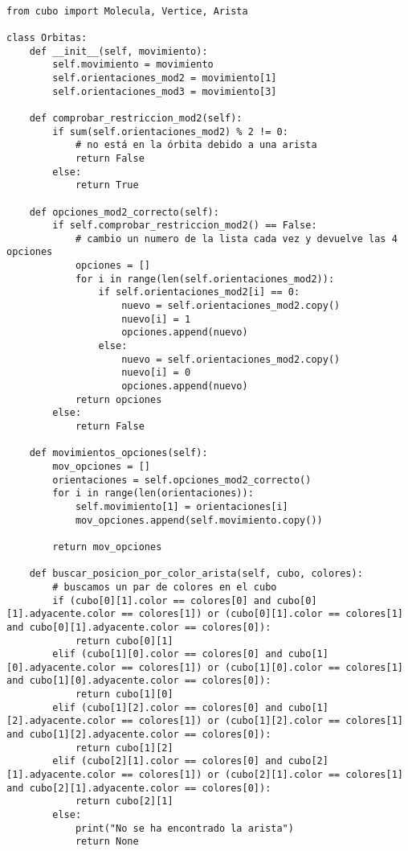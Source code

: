 \begin{lstlisting}

from cubo import Molecula, Vertice, Arista

class Orbitas:
    def __init__(self, movimiento):
        self.movimiento = movimiento
        self.orientaciones_mod2 = movimiento[1]
        self.orientaciones_mod3 = movimiento[3]

    def comprobar_restriccion_mod2(self):
        if sum(self.orientaciones_mod2) % 2 != 0:
            # no está en la órbita debido a una arista
            return False
        else:
            return True

    def opciones_mod2_correcto(self):
        if self.comprobar_restriccion_mod2() == False:
            # cambio un numero de la lista cada vez y devuelve las 4 opciones
            opciones = []
            for i in range(len(self.orientaciones_mod2)):
                if self.orientaciones_mod2[i] == 0:
                    nuevo = self.orientaciones_mod2.copy()
                    nuevo[i] = 1
                    opciones.append(nuevo)
                else:
                    nuevo = self.orientaciones_mod2.copy()
                    nuevo[i] = 0
                    opciones.append(nuevo)
            return opciones
        else:
            return False

    def movimientos_opciones(self):
        mov_opciones = []
        orientaciones = self.opciones_mod2_correcto()
        for i in range(len(orientaciones)):
            self.movimiento[1] = orientaciones[i]
            mov_opciones.append(self.movimiento.copy())            

        return mov_opciones
    
    def buscar_posicion_por_color_arista(self, cubo, colores):
        # buscamos un par de colores en el cubo
        if (cubo[0][1].color == colores[0] and cubo[0][1].adyacente.color == colores[1]) or (cubo[0][1].color == colores[1] and cubo[0][1].adyacente.color == colores[0]):
            return cubo[0][1]
        elif (cubo[1][0].color == colores[0] and cubo[1][0].adyacente.color == colores[1]) or (cubo[1][0].color == colores[1] and cubo[1][0].adyacente.color == colores[0]): 
            return cubo[1][0]
        elif (cubo[1][2].color == colores[0] and cubo[1][2].adyacente.color == colores[1]) or (cubo[1][2].color == colores[1] and cubo[1][2].adyacente.color == colores[0]):
            return cubo[1][2]
        elif (cubo[2][1].color == colores[0] and cubo[2][1].adyacente.color == colores[1]) or (cubo[2][1].color == colores[1] and cubo[2][1].adyacente.color == colores[0]):
            return cubo[2][1]
        else:
            print("No se ha encontrado la arista")
            return None
        

\end{lstlisting}
